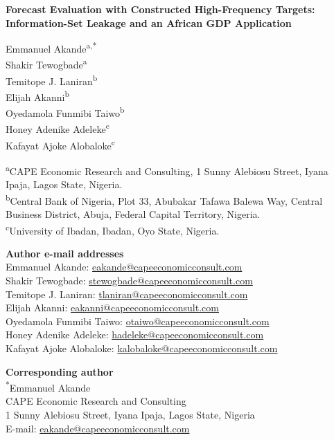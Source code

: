 \documentclass[12pt]{article}
\begin{document}
\begin{center}
{\Large\bfseries Forecast Evaluation with Constructed High-Frequency Targets: Information-Set Leakage and an African GDP Application\par}
\vspace{0.7cm}
Emmanuel Akande\textsuperscript{a,*}\\
Shakir Tewogbade\textsuperscript{a}\\
Temitope J. Laniran\textsuperscript{b}\\
Elijah Akanni\textsuperscript{b}\\
Oyedamola Funmibi Taiwo\textsuperscript{b}\\
Honey Adenike Adeleke\textsuperscript{c}\\
Kafayat Ajoke Alobaloke\textsuperscript{c}
\end{center}
\vspace{0.4cm}
\textsuperscript{a}CAPE Economic Research and Consulting, 1 Sunny Alebiosu Street, Iyana Ipaja, Lagos State, Nigeria.\\
\textsuperscript{b}Central Bank of Nigeria, Plot 33, Abubakar Tafawa Balewa Way, Central Business District, Abuja, Federal Capital Territory, Nigeria.\\
\textsuperscript{c}University of Ibadan, Ibadan, Oyo State, Nigeria.

\textbf{Author e-mail addresses}\\
Emmanuel Akande: \href{mailto:eakande@capeeconomicconsult.com}{eakande@capeeconomicconsult.com}\\
Shakir Tewogbade: \href{mailto:stewogbade@capeeconomicconsult.com}{stewogbade@capeeconomicconsult.com}\\
Temitope J. Laniran: \href{mailto:tlaniran@capeeconomicconsult.com}{tlaniran@capeeconomicconsult.com}\\
Elijah Akanni: \href{mailto:eakanni@capeeconomicconsult.com}{eakanni@capeeconomicconsult.com}\\
Oyedamola Funmibi Taiwo: \href{mailto:otaiwo@capeeconomicconsult.com}{otaiwo@capeeconomicconsult.com}\\
Honey Adenike Adeleke: \href{mailto:hadeleke@capeeconomicconsult.com}{hadeleke@capeeconomicconsult.com}\\
Kafayat Ajoke Alobaloke: \href{mailto:kalobaloke@capeeconomicconsult.com}{kalobaloke@capeeconomicconsult.com}

\textbf{Corresponding author}\\
\textsuperscript{*}Emmanuel Akande\\
CAPE Economic Research and Consulting\\
1 Sunny Alebiosu Street, Iyana Ipaja, Lagos State, Nigeria\\
E-mail: \href{mailto:eakande@capeeconomicconsult.com}{eakande@capeeconomicconsult.com}
\end{document}
